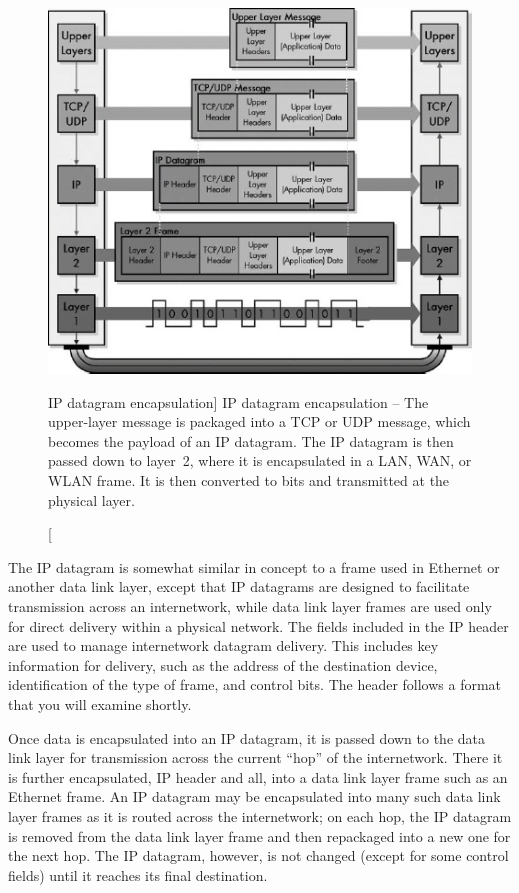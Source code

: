 \begin{figure}
   \centering
   \includegraphics[width=.7\textwidth]{images/ip-datagram-encapsulation.jpg}
   \caption
      [IP datagram encapsulation]{
         IP datagram encapsulation -- The upper-layer message is packaged into a TCP or UDP message, which becomes the payload of an IP datagram.
         The IP datagram is then passed down to layer~2, where it is encapsulated in a LAN, WAN, or WLAN frame.
         It is then converted to bits and transmitted at the physical layer.
      }
   \label{fig:ip-datagram-encapsulation}
\end{figure}


The IP datagram is somewhat similar in concept to a frame used in
Ethernet or another data link layer, except that IP datagrams are
designed to facilitate transmission across an internetwork, while data
link layer frames are used only for direct delivery within a physical
network. The fields included in the IP header are used to manage
internetwork datagram delivery. This includes key information for
delivery, such as the address of the destination device, identification
of the type of frame, and control bits. The header follows a format that
you will examine shortly.

Once data is encapsulated into an IP datagram, it is passed down to the
data link layer for transmission across the current ``hop'' of the
internetwork. There it is further encapsulated, IP header and all, into
a data link layer frame such as an Ethernet frame. An IP datagram may be
encapsulated into many such data link layer frames as it is routed
across the internetwork; on each hop, the IP datagram is removed from
the data link layer frame and then repackaged into a new one for the
next hop. The IP datagram, however, is not changed (except for some
control fields) until it reaches its final destination.



